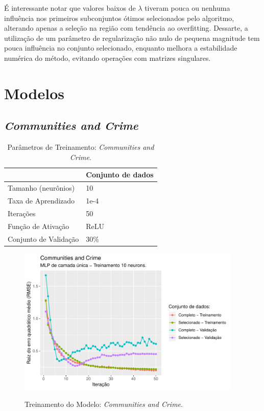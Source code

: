É interessante notar que valores baixos de $\lambda$ tiveram pouca ou nenhuma influência nos primeiros subconjuntos ótimos selecionados pelo algoritmo, alterando apenas a seleção na região com tendência ao overfitting. Dessarte, a utilização de um parâmetro de regularização não nulo de pequena magnitude tem pouca influência no conjunto selecionado, enquanto melhora a estabilidade numérica do método, evitando operações com matrizes singulares.


\FloatBarrier
\section{Modelos}

\subsection{\textit{Communities and Crime}}

\begin{table}[!htb]
    \caption{Parâmetros de Treinamento: \textit{Communities and Crime}.}
    \begin{center}        
        \begin{tabular}{@{}ll@{}}
        \toprule
                            & Conjunto de dados \\ \midrule
        Tamanho (neurônios)     & 10                \\
        Taxa de Aprendizado   & 1e-4              \\
        Iterações             & 50                \\
        Função de Ativação    & ReLU              \\
        Conjunto de Validação & $30\%$            \\ \bottomrule
        \end{tabular}
    \end{center}
    \label{tbl:treinamento_comm_crime}
\end{table}

\begin{figure}[!htb]
    \centering
    \caption{Treinamento do Modelo: \textit{Communities and Crime}.}
    \includegraphics[height=200pt]{imgs/res/CommunitiesandCrime_model.pdf}
    \label{fig:modelo_CommunitiesandCrime_model}
\end{figure}

